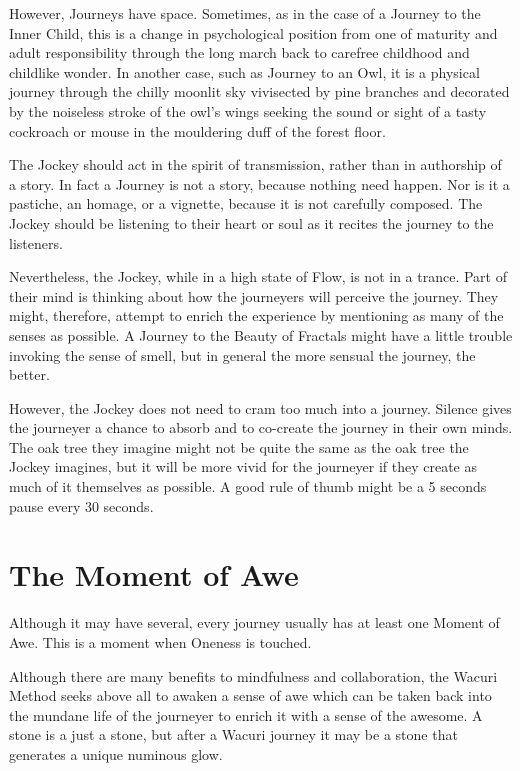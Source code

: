 \documentclass[12pt]{book}
\begin{document}
However, Journeys have space. Sometimes, as in the case of a Journey
to the Inner Child, this is a change in psychological position from
one of maturity and adult responsibility through the long march back
to carefree childhood and childlike wonder.  In another case, such as
Journey to an Owl, it is a physical journey through the chilly moonlit
sky vivisected by pine branches and decorated by the noiseless stroke
of the owl’s wings seeking the sound or sight of a tasty cockroach or
mouse in the mouldering duff of the forest floor.
					
The Jockey should act in the spirit of transmission, rather than in
authorship of a story. In fact a Journey is not a story, because
nothing need happen. Nor is it a pastiche, an homage, or a vignette,
because it is not carefully composed.  The Jockey should be listening
to their heart or soul as it recites the journey to the listeners.
					
Nevertheless, the Jockey, while in a high state of Flow, is not in a
trance. Part of their mind is thinking about how the journeyers will
perceive the journey. They might, therefore, attempt to enrich the
experience by mentioning as many of the senses as possible. A Journey
to the Beauty of Fractals might have a little trouble invoking the
sense of smell, but in general the more sensual the journey, the
better.
					
However, the Jockey does not need to cram too much into a
journey. Silence gives the journeyer a chance to absorb and to
co-create the journey in their own minds. The oak tree they imagine
might not be quite the same as the oak tree the Jockey imagines, but
it will be more vivid for the journeyer if they create as much of it
themselves as possible. A good rule of thumb might be a 5 seconds
pause every 30 seconds.
					
\section{The Moment of Awe}
					
Although it may have several, every journey usually has at least one
Moment of Awe. This is a moment when Oneness is touched.
					
Although there are many benefits to mindfulness and collaboration, the
Wacuri Method seeks above all to awaken a sense of awe which can be
taken back into the mundane life of the journeyer to enrich it with a
sense of the awesome. A stone is a just a stone, but after a Wacuri
journey it may be a stone that generates a unique numinous glow.
					
\end{document}
